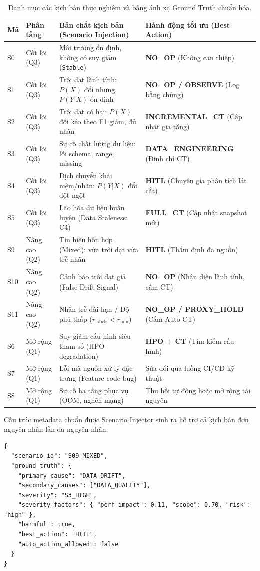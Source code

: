\begin{table}[ht]
\centering
\caption{Danh mục các kịch bản thực nghiệm và bảng ánh xạ Ground Truth chuẩn hóa.}\label{tab:scenarios}
\begin{tabularx}{\linewidth}{@{}C{0.9cm} L{2.0cm} L{5.2cm} Y@{}}
\toprule
\textbf{Mã} & \textbf{Phân tầng} & \textbf{Bản chất kịch bản (Scenario Injection)} & \textbf{Hành động tối ưu (Best Action)} \\
\midrule
S0 & Cốt lõi (Q3) & Môi trường ổn định, không có suy giảm (\texttt{Stable}) & \textbf{NO\_OP} (Không can thiệp) \\
S1 & Cốt lõi (Q3) & Trôi dạt lành tính: $P(X)$ đổi nhưng $P(Y|X)$ ổn định & \textbf{NO\_OP / OBSERVE} (Log bằng chứng) \\
S2 & Cốt lõi (Q3) & Trôi dạt có hại: $P(X)$ đổi kéo theo F1 giảm, đủ nhãn & \textbf{INCREMENTAL\_CT} (Cập nhật gia tăng) \\
S3 & Cốt lõi (Q3) & Sự cố chất lượng dữ liệu: lỗi schema, range, missing & \textbf{DATA\_ENGINEERING} (Đình chỉ CT) \\
S4 & Cốt lõi (Q3) & Dịch chuyển khái niệm/nhãn: $P(Y|X)$ đổi đột ngột & \textbf{HITL} (Chuyên gia phân tích lát cắt) \\
S5 & Cốt lõi (Q3) & Lão hóa dữ liệu huấn luyện (Data Staleness: C4) & \textbf{FULL\_CT} (Cập nhật snapshot mới) \\
\midrule
S9 & Nâng cao (Q2) & Tín hiệu hỗn hợp (Mixed): vừa trôi dạt vừa trễ nhãn & \textbf{HITL} (Thẩm định đa nguồn) \\
S10 & Nâng cao (Q2) & Cảnh báo trôi dạt giả (False Drift Signal) & \textbf{NO\_OP} (Nhận diện lành tính, cấm CT) \\
S11 & Nâng cao (Q2) & Nhãn trễ dài hạn / Độ phủ thấp ($r_\text{labels} < r_\text{min}$) & \textbf{NO\_OP / PROXY\_HOLD} (Cấm Auto CT) \\
\midrule
S6 & Mở rộng (Q1) & Suy giảm cấu hình siêu tham số (HPO degradation) & \textbf{HPO + CT} (Tìm kiếm cấu hình) \\
S7 & Mở rộng (Q1) & Lỗi mã nguồn xử lý đặc trưng (Feature code bug) & Sửa đổi qua luồng CI/CD kỹ thuật \\
S8 & Mở rộng (Q1) & Sự cố hạ tầng phục vụ (OOM, nghẽn mạng) & Thu hồi tự động hoặc mở rộng tài nguyên \\
\bottomrule
\end{tabularx}
\end{table}

Cấu trúc metadata chuẩn được Scenario Injector sinh ra hỗ trợ cả kịch bản đơn nguyên nhân lẫn đa nguyên nhân:
\begin{tcolorbox}[colback=gray!4!white,colframe=gray!45!black,arc=2pt,boxrule=0.5pt,top=3pt,bottom=3pt,left=5pt,right=5pt]
\small
\begin{verbatim}
{
  "scenario_id": "S09_MIXED",
  "ground_truth": {
    "primary_cause": "DATA_DRIFT",
    "secondary_causes": ["DATA_QUALITY"],
    "severity": "S3_HIGH",
    "severity_factors": { "perf_impact": 0.11, "scope": 0.70, "risk": "high" },
    "harmful": true,
    "best_action": "HITL",
    "auto_action_allowed": false
  }
}
\end{verbatim}
\end{tcolorbox}

